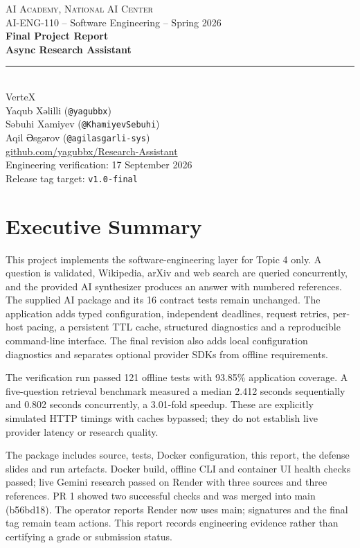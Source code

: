\documentclass[11pt,a4paper]{article}
\begin{document}
\begin{center}
{\small\textsc{AI Academy, National AI Center}\\AI-ENG-110 -- Software Engineering -- Spring 2026}\\[1cm]
{\Large\bfseries\color{accent}Final Project Report}\\[0.4cm]
{\LARGE\bfseries Async Research Assistant}\\[0.5cm]
\rule{0.85\textwidth}{0.6pt}\\[0.5cm]
{\Large VerteX}\\[0.4cm]
Yaqub Xəlilli (\texttt{@yagubbx})\\
Səbuhi Xamiyev (\texttt{@KhamiyevSebuhi})\\
Aqil Əsgərov (\texttt{@agilasgarli-sys})\\[0.5cm]
\href{https://github.com/yagubbx/Research-Assistant}{github.com/yagubbx/Research-Assistant}\\[0.25cm]
Engineering verification: 17 September 2026\\
Release tag target: \texttt{v1.0-final}
\end{center}
\section*{Executive Summary}
This project implements the software-engineering layer for Topic 4 only. A question is validated, Wikipedia, arXiv and web search are queried concurrently, and the provided AI synthesizer produces an answer with numbered references. The supplied AI package and its 16 contract tests remain unchanged. The application adds typed configuration, independent deadlines, request retries, per-host pacing, a persistent TTL cache, structured diagnostics and a reproducible command-line interface. The final revision also adds local configuration diagnostics and separates optional provider SDKs from offline requirements.

The verification run passed 121 offline tests with 93.85\% application coverage. A five-question retrieval benchmark measured a median 2.412 seconds sequentially and 0.802 seconds concurrently, a 3.01-fold speedup. These are explicitly simulated HTTP timings with caches bypassed; they do not establish live provider latency or research quality.

The package includes source, tests, Docker configuration, this report, the defense slides and run artefacts. Docker build, offline CLI and container UI health checks passed; live Gemini research passed on Render with three sources and three references. PR 1 showed two successful checks and was merged into main (b56bd18). The operator reports Render now uses main; signatures and the final tag remain team actions. This report records engineering evidence rather than certifying a grade or submission status.
\end{document}
